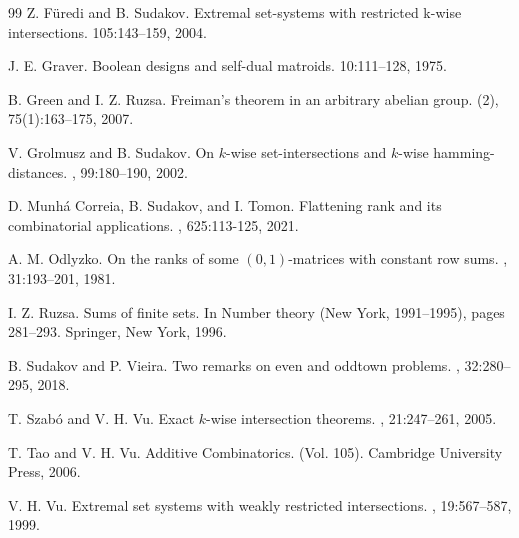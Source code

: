 \begin{thebibliography}{99}
Z. F\"uredi and B. Sudakov.
\newblock Extremal set-systems with restricted k-wise intersections.
 105:143--159, 2004.

J. E. Graver.
\newblock Boolean designs and self-dual matroids.
 10:111--128, 1975.

B. Green and I. Z. Ruzsa.
\newblock Freiman's theorem in an arbitrary abelian group.
 (2), 75(1):163--175, 2007.

V. Grolmusz and B. Sudakov.
\newblock On $k$-wise set-intersections and $k$-wise hamming-distances.
, 99:180--190, 2002. 

D. Munh\'a Correia, B. Sudakov, and I. Tomon.
\newblock Flattening rank and its combinatorial applications.
, 625:113-125, 2021.

A. M. Odlyzko.
\newblock On the ranks of some $(0,1)$-matrices with constant row sums.
, 31:193--201, 1981.

I. Z. Ruzsa.
\newblock Sums of finite sets.
\newblock In Number theory (New York, 1991--1995), pages 281--293. Springer, New York, 1996.

B. Sudakov and P. Vieira.
\newblock Two remarks on even and oddtown problems.
, 32:280--295, 2018.

T. Szab\'o and V. H. Vu.
\newblock Exact $k$-wise intersection theorems. 
, 21:247--261, 2005. 

T. Tao and V. H. Vu.
\newblock Additive Combinatorics.
\newblock (Vol. 105). Cambridge University Press, 2006. 

V. H. Vu.
\newblock Extremal set systems with weakly restricted intersections.
, 19:567--587, 1999.

\end{thebibliography}
%
%
